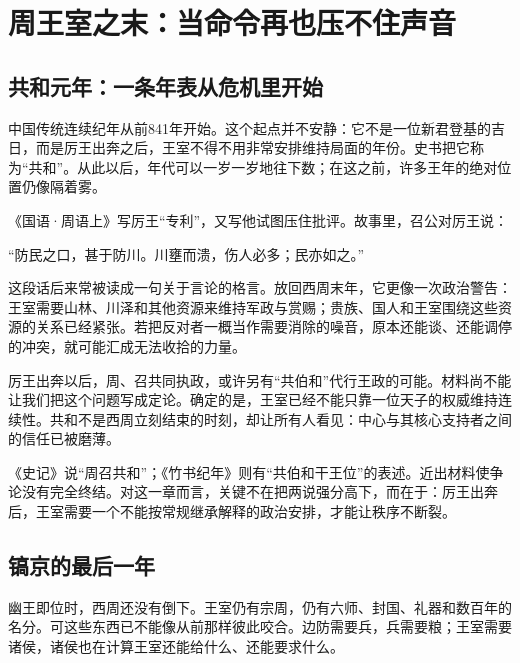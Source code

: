 \section{周王室之末：当命令再也压不住声音}

\subsection{共和元年：一条年表从危机里开始}


中国传统连续纪年从前841年开始。这个起点并不安静：它不是一位新君登基的吉日，而是厉王出奔之后，王室不得不用非常安排维持局面的年份。史书把它称为“共和”。从此以后，年代可以一岁一岁地往下数；在这之前，许多王年的绝对位置仍像隔着雾。

《国语·周语上》写厉王“专利”，又写他试图压住批评。故事里，召公对厉王说：

\begin{textwindow}[声音与河水]
“防民之口，甚于防川。川壅而溃，伤人必多；民亦如之。”
\end{textwindow}

这段话后来常被读成一句关于言论的格言。放回西周末年，它更像一次政治警告：王室需要山林、川泽和其他资源来维持军政与赏赐；贵族、国人和王室围绕这些资源的关系已经紧张。若把反对者一概当作需要消除的噪音，原本还能谈、还能调停的冲突，就可能汇成无法收拾的力量。

厉王出奔以后，周、召共同执政，或许另有“共伯和”代行王政的可能。材料尚不能让我们把这个问题写成定论。确定的是，王室已经不能只靠一位天子的权威维持连续性。共和不是西周立刻结束的时刻，却让所有人看见：中心与其核心支持者之间的信任已被磨薄。

\begin{debate}[“共和”是谁在执政]
《史记》说“周召共和”；《竹书纪年》则有“共伯和干王位”的表述。近出材料使争论没有完全终结。对这一章而言，关键不在把两说强分高下，而在于：厉王出奔后，王室需要一个不能按常规继承解释的政治安排，才能让秩序不断裂。
\end{debate}

\subsection{镐京的最后一年}

幽王即位时，西周还没有倒下。王室仍有宗周，仍有六师、封国、礼器和数百年的名分。可这些东西已不能像从前那样彼此咬合。边防需要兵，兵需要粮；王室需要诸侯，诸侯也在计算王室还能给什么、还能要求什么。


